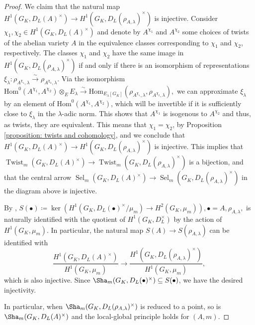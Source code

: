 \documentclass[a4paper,10pt]{amsart}
\theoremstyle{plain}
\theoremstyle{definition}
\theoremstyle{remark}
\def\mr#1{\mathrm{#1}}
\newcommand{\bD}{D_L}
\renewcommand{\hom}{\mr{Hom}}
\DeclareMathOperator{\Sel}{Sel}
\DeclareMathOperator{\Twist}{Twist}
\begin{document}
\begin{proof}
We claim that the natural map \(H^1(G_K, \bD(A)^\times) \to H^1(G_K, \bD(\rho_{A, \lambda})^\times)\) is injective. Consider \(\chi_1, \chi_2 \in H^1(G_K, \bD(A)^\times)\) and denote by \(A^{\chi_1}\) and \(A^{\chi_2}\) some choices of twists of the abelian variety \(A\) in the equivalence classes corresponding to \(\chi_1\) and \(\chi_2\), respectively. The classes \(\chi_1\) and \(\chi_2\) have the same image in \(H^1(G_K, \bD(\rho_{A, \lambda})^\times)\) if and only if there is an isomorphism of representations \(\xi_\lambda \colon \rho_{A^{\chi_1}, \lambda} \xrightarrow{\sim} \rho_{A^{\chi_2}, \lambda}\). Via the isomorphism
\(
    \hom^0(A^{\chi_1}, A^{\chi_2}) \otimes_{E} E_\lambda \xrightarrow{\sim} \hom_{E_\lambda[G_K]}(\rho_{A^{\chi_1}, \lambda}, \rho_{A^{\chi_2}, \lambda}),
\)
we can approximate \(\xi_\lambda\) by an element of \(\hom^0(A^{\chi_1}, A^{\chi_2})\), which will be invertible if it is sufficiently close to \(\xi_\lambda\) in the \(\lambda\)-adic norm. This shows that \(A^{\chi_1}\) is isogenous to \(A^{\chi_2}\) and thus, as twists, they are equivalent. This means that \(\chi_1 = \chi_2\), by Proposition \ref{proposition: twists and cohomology}, and we conclude that \(H^1(G_K, \bD(A)^\times) \to H^1(G_K, \bD(\rho_{A, \lambda})^\times)\) is injective. This implies that \(\Twist_m(G_K, \bD(A)^\times) \to \Twist_m(G_K, \bD(\rho_{A, \lambda})^\times)\) is a bijection, and that the central arrow \(\Sel_m(G_K, \bD(A)^\times) \to \Sel_m(G_K, \bD(\rho_{A, \lambda})^\times)\) in the diagram above is injective.

By \cite[Corollary to Proposition I.44, \S5]{Serre-Galois}, \(S(\bullet) \coloneqq \ker(H^1(G_K, \bD(\bullet)^\times/\mu_m) \to H^2(G_K, \mu_m)), \bullet = A, \rho_{A, \lambda},\) is naturally identified with the quotient of \(H^1(G_K, \bD^\times)\) by the action of \(H^1(G_K, \mu_m)\). In particular, the natural map \(S(A) \to S(\rho_{A, \lambda})\) can be identified with
\[
    \frac{H^1(G_K, \bD(A)^\times)}{H^1(G_K, \mu_m)} \longrightarrow \frac{H^1(G_K, \bD(\rho_{A, \lambda})^\times)}{H^1(G_K, \mu_m)},
\]
which is also injective. Since \(\Sha_m(G_K, \bD(\bullet)^\times) \subseteq S(\bullet)\), we have the desired injectivity.

In particular, when \(\Sha_m(G_K, \bD(\rho_{A, \lambda})^\times)\) is reduced to a point, so is \(\Sha_m(G_K, \bD(A)^\times)\)
and the local-global principle holds for \((A, m)\).
\end{proof}
\end{document}

